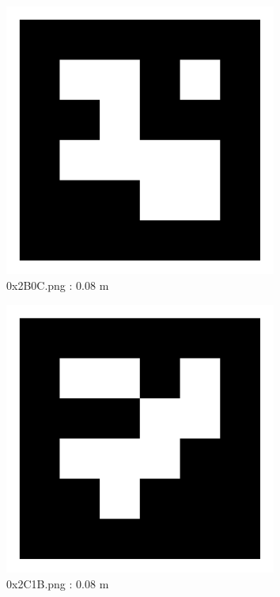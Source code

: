 \documentclass[11pt,a4,BCOR=0cm]{scrartcl}
\begin{document}
\begin{figure}
  \centering
    \includegraphics[width=8.955cm]{0x2B0C.pdf}
    \caption{0x2B0C.png : 0.08 m}
    \label{fig:0x2B0C.pdf}
  
\end{figure} 

\begin{figure}
  \centering
    \includegraphics[width=8.955cm]{0x2C1B.pdf}
    \caption{0x2C1B.png : 0.08 m}
    \label{fig:0x2C1B.pdf}
  
\end{figure} 

\clearpage
\end{document}
